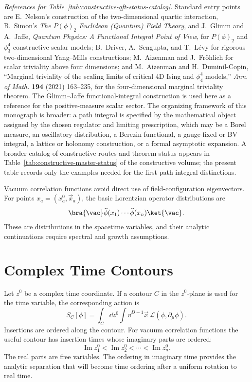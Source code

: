 \emph{References for Table~\ref{tab:constructive-qft-status-catalog}.}
Standard entry points are E.~Nelson's construction of the two-dimensional
quartic interaction, B.~Simon's
\emph{The \(P(\phi)_2\) Euclidean (Quantum) Field Theory}, and J.~Glimm and
A.~Jaffe, \emph{Quantum Physics: A Functional Integral Point of View}, for
\(P(\phi)_2\) and \(\phi^4_3\) constructive scalar models; B.~Driver,
A.~Sengupta, and T.~L\'evy for rigorous two-dimensional Yang--Mills
constructions; M.~Aizenman and J.~Fr\"ohlich for scalar triviality above four
dimensions; and M.~Aizenman and H.~Duminil-Copin, ``Marginal triviality of the
scaling limits of critical 4D Ising and \(\phi^4_4\) models,'' \emph{Ann. of
Math.} \textbf{194} (2021) 163--235, for the four-dimensional marginal
triviality theorem.
The Glimm--Jaffe functional-integral construction is used here as a reference
for the positive-measure scalar sector.  The organizing framework of this
monograph is broader: a path integral is specified by the mathematical object
assigned by the chosen regulator and limiting prescription, which may be a
Borel measure, an oscillatory distribution, a Berezin functional, a
gauge-fixed or BV integral, a lattice or holonomy construction, or a formal
asymptotic expansion.  A broader catalog of constructive routes and theorem
status appears in Table~\ref{tab:constructive-master-status} of the
constructive volume; the present table records only the examples needed for
the first path-integral distinctions.

Vacuum correlation functions avoid direct use of field-configuration
eigenvectors. For points \(x_a=(x_a^0,\vec x_a)\), the basic Lorentzian
operator distributions are
\[
  \bra{\vac}
  \widehat\phi(x_1)\cdots\widehat\phi(x_n)
  \ket{\vac}.
\]
These are distributions in the spacetime variables, and their analytic
continuations require spectral and growth assumptions.

\section{Complex Time Contours}

\begin{definition}
\label{def:complex-time-contour-ordered-insertions}
Let \(z^0\) be a complex time coordinate. If a contour \(C\) in the
\(z^0\)-plane is used for the time variable, the corresponding action is
\[
  S_C[\phi]
  =
  \int_C\dd z^0
  \int\dd^{D-1}\vec x\,
  \mathcal L(\phi,\partial_\mu\phi).
\]
Insertions are ordered along the contour. For vacuum correlation functions the
useful contour has insertion times whose imaginary parts are ordered:
\[
  \operatorname{Im}z_1^0
  <
  \operatorname{Im}z_2^0
  <
  \cdots
  <
  \operatorname{Im}z_n^0.
\]
The real parts are free variables. The ordering in imaginary time provides the
analytic separation that will become time ordering after a uniform rotation to
real time.
\end{definition}

